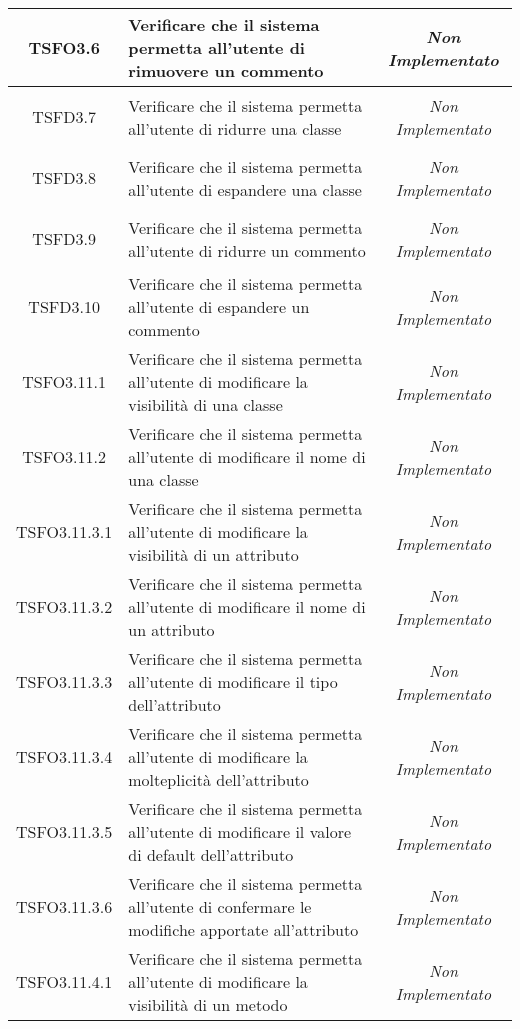 \begin{longtable}{|c|>{}m{8cm}|c|}
\hypertarget{TSFO3.6}{TSFO3.6} & Verificare che il sistema permetta all'utente di rimuovere un commento & \textit{Non Implementato}\\ \hline
\hypertarget{TSFD3.7}{TSFD3.7} & Verificare che il sistema permetta all'utente di ridurre una classe & \textit{Non Implementato}\\ \hline
\hypertarget{TSFD3.8}{TSFD3.8} & Verificare che il sistema permetta all'utente di espandere una classe & \textit{Non Implementato}\\ \hline
\hypertarget{TSFD3.9}{TSFD3.9} & Verificare che il sistema permetta all'utente di ridurre un commento & \textit{Non Implementato}\\ \hline
\hypertarget{TSFD3.10}{TSFD3.10} & Verificare che il sistema permetta all'utente di espandere un commento & \textit{Non Implementato}\\ \hline
\hypertarget{TSFO3.11.1}{TSFO3.11.1} & Verificare che il sistema permetta all'utente di modificare la visibilità di una classe & \textit{Non Implementato}\\ \hline
\hypertarget{TSFO3.11.2}{TSFO3.11.2} & Verificare che il sistema permetta all'utente di modificare il nome di una classe & \textit{Non Implementato}\\ \hline
\hypertarget{TSFO3.11.3.1}{TSFO3.11.3.1} & Verificare che il sistema permetta all'utente di modificare la visibilità di un attributo & \textit{Non Implementato}\\ \hline
\hypertarget{TSFO3.11.3.2}{TSFO3.11.3.2} & Verificare che il sistema permetta all'utente di modificare il nome di un attributo & \textit{Non Implementato}\\ \hline
\hypertarget{TSFO3.11.3.3}{TSFO3.11.3.3} & Verificare che il sistema permetta all'utente di modificare il tipo dell'attributo & \textit{Non Implementato}\\ \hline
\hypertarget{TSFO3.11.3.4}{TSFO3.11.3.4} & Verificare che il sistema permetta all'utente di modificare la molteplicità dell'attributo & \textit{Non Implementato}\\ \hline
\hypertarget{TSFO3.11.3.5}{TSFO3.11.3.5} & Verificare che il sistema permetta all'utente di modificare il valore di default dell'attributo & \textit{Non Implementato}\\ \hline
\hypertarget{TSFO3.11.3.6}{TSFO3.11.3.6} & Verificare che il sistema permetta all'utente di confermare le modifiche apportate all'attributo & \textit{Non Implementato}\\ \hline
\hypertarget{TSFO3.11.4.1}{TSFO3.11.4.1} & Verificare che il sistema permetta all'utente di modificare la visibilità di un metodo & \textit{Non Implementato}\\ \hline

\end{longtable}
